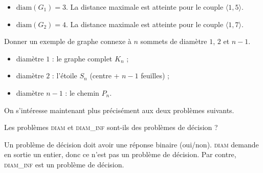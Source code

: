 \begin{exercice}
\begin{questions}
\begin{center}
  \end{center}
  \end{questions}
  \begin{corrections}
    \begin{itemize}
    \item $\mathrm{diam}(G_1)=3$. La distance maximale est atteinte pour le couple $\langle 1, 5 \rangle$.
    \item $\mathrm{diam}(G_2)=4$. La distance maximale est atteinte pour le couple $\langle 1, 7 \rangle$.
    \end{itemize}
  \end{corrections}

  \begin{questions}
  \item Donner un exemple de graphe connexe à $n$ sommets de diamètre $1$, $2$ et $n-1$.
  \end{questions}
  \begin{corrections}
    \begin{itemize}
    \item diamètre $1$ : le graphe complet $K_n$ ;
    \item diamètre $2$ : l'étoile $S_n$ (centre + $n-1$ feuilles) ;
    \item diamètre $n-1$ : le chemin $P_n$.
    \end{itemize}
  \end{corrections}

  On s'intéresse maintenant plus précisément aux deux problèmes suivants. 
  


  \ifcorrection{\pagebreak}
  \begin{questions}
  \item Les problèmes \textsc{diam} et \textsc{diam\_inf} sont-ils des problèmes de décision ?
  \end{questions}
  \begin{corrections}
    Un problème de décision doit avoir une réponse binaire (\textsf{oui}/\textsf{non}).
    \textsc{diam} demande en sortie un entier, donc ce n'est pas un problème de décision.
    Par contre, \textsc{diam\_inf} est un problème de décision. 
  \end{corrections}


\end{exercice}
